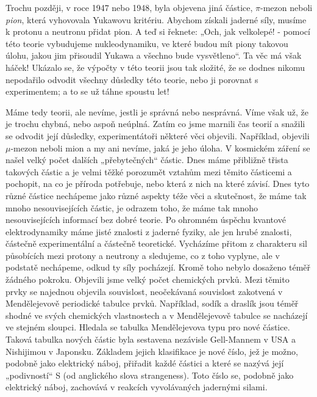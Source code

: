 {    Trochu později, v roce 1947 nebo 1948, byla objevena jiná částice, \(\pi\text{-mezon}\) neboli 
    \emph{pion}, která vyhovovala Yukawovu kritériu. Abychom získali jaderné síly, musíme k protonu 
    a neutronu přidat pion. A teď si řeknete: „Och, jak velkolepé! - pomocí této teorie vybudujeme 
    nukleodynamiku, ve které budou mít piony takovou úlohu, jakou jim přisoudil Yukawa a všechno 
    bude vysvětleno“. Ta věc má však háček! Ukázalo se, že výpočty v této teorii jsou tak složité, 
    že se dodnes nikomu nepodařilo odvodit všechny důsledky této teorie, nebo ji porovnat s 
    experimentem; a to se už táhne spoustu let!
    
    Máme tedy teorii, ale nevíme, jestli je správná nebo nesprávná. Víme však už, že je trochu 
    chybná, nebo aspoň neúplná. Zatím co jsme marnili čas teorií a snažili se odvodit její 
    důsledky, experimentátoři některé věci objevili. Například, objevili \(\mu\text{-mezon}\) 
    neboli mion a my ani nevíme, jaká je jeho úloha. V kosmickém záření se našel velký počet 
    dalších „přebytečných“ částic. Dnes máme přibližně třista takových částic a je velmi těžké 
    porozumět vztahům mezi těmito částicemi a pochopit, na co je příroda potřebuje, nebo která z 
    nich na které závisí. Dnes tyto různé částice nechápeme jako různé aspekty téže věci a 
    skutečnost, že máme tak mnoho nesouvisejících částic, je odrazem toho, že máme tak mnoho 
    nesouvisejících informací bez dobré teorie. Po ohromném úspěchu kvantové elektrodynamiky máme 
    jisté znalosti z jaderné fyziky, ale jen hrubé znalosti, částečně experimentální a částečně 
    teoretické. Vycházíme přitom z charakteru sil působících mezi protony a neutrony a sledujeme, 
    co z toho vyplyne, ale v podstatě nechápeme, odkud ty síly pocházejí. Kromě toho nebylo 
    dosaženo téměř žádného pokroku. Objevili jsme velký počet chemických prvků. Mezi těmito prvky 
    se najednou objevila souvislost, neočekávaná souvislost zakotvená v Mendělejevově periodické 
    tabulce prvků. Například, sodík a draslík jsou téměř shodné ve svých chemických vlastnostech a 
    v Mendělejevově tabulce se nacházejí ve stejném sloupci. Hledala se tabulka Mendělejevova typu 
    pro nové částice. Taková tabulka nových částic byla sestavena nezávisle Gell-Mannem v USA a 
    Nishijimou v Japonsku. Základem jejich klasifikace je nové číslo, jež je možno, podobně jako 
    elektrický náboj, přiřadit každé částici a které se nazývá její „podivností“ S (od anglického 
    slova strangeness). Toto číslo se, podobně jako elektrický náboj, zachovává v reakcích 
    vyvolávaných jadernými silami.  
   
} %
\printbibliography[title={Seznam literatury}, heading=subbibliography]
